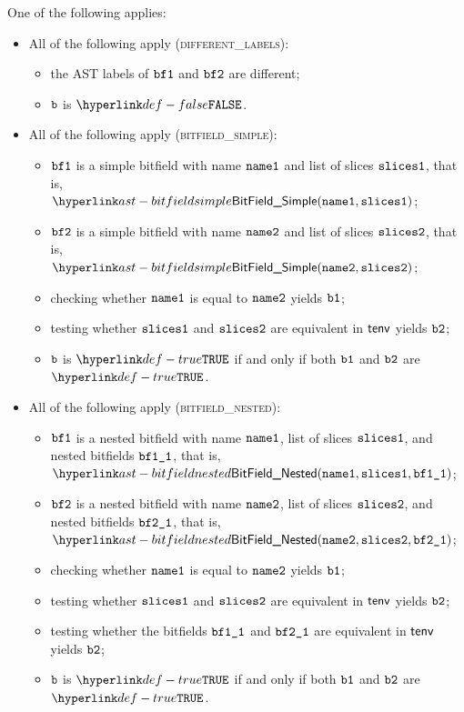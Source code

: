 One of the following applies:
\begin{itemize}
  \item All of the following apply (\textsc{different\_labels}):
  \begin{itemize}
    \item the AST labels of $\texttt{bf1}$ and $\texttt{bf2}$ are different;
    \item $\texttt{b}$ is $\False$.
  \end{itemize}

  \item All of the following apply (\textsc{bitfield\_simple}):
  \begin{itemize}
    \item $\texttt{bf1}$ is a simple bitfield with name $\texttt{name1}$ and list of slices $\texttt{slices1}$, that is, \\ $\BitFieldSimple(\nameone, \slicesone)$;
    \item $\texttt{bf2}$ is a simple bitfield with name $\texttt{name2}$ and list of slices $\texttt{slices2}$, that is, \\ $\BitFieldSimple(\nametwo, \slicestwo)$;
    \item checking whether $\texttt{name1}$ is equal to $\texttt{name2}$ yields $\texttt{b1}$;
    \item testing whether $\texttt{slices1}$ and $\texttt{slices2}$ are equivalent in $\textsf{tenv}$ yields $\texttt{b2}$\ProseOrTypeError;
    \item $\texttt{b}$ is $\True$ if and only if both $\texttt{b1}$ and $\texttt{b2}$ are $\True$.
  \end{itemize}

  \item All of the following apply (\textsc{bitfield\_nested}):
  \begin{itemize}
    \item $\texttt{bf1}$ is a nested bitfield with name $\texttt{name1}$, list of slices $\texttt{slices1}$, and nested bitfields $\texttt{bf1\_1}$, that is,
          $\BitFieldNested(\nameone, \slicesone, \bfoneone)$;
    \item $\texttt{bf2}$ is a nested bitfield with name $\texttt{name2}$, list of slices $\texttt{slices2}$, and nested bitfields $\texttt{bf2\_1}$, that is,
          $\BitFieldNested(\nametwo, \slicestwo, \bftwoone)$;
    \item checking whether $\texttt{name1}$ is equal to $\texttt{name2}$ yields $\texttt{b1}$;
    \item testing whether $\texttt{slices1}$ and $\texttt{slices2}$ are equivalent in $\textsf{tenv}$ yields $\texttt{b2}$\ProseOrTypeError;
    \item testing whether the bitfields $\texttt{bf1\_1}$ and $\texttt{bf2\_1}$ are equivalent in $\textsf{tenv}$ yields $\texttt{b2}$\ProseOrTypeError;
    \item $\texttt{b}$ is $\True$ if and only if both $\texttt{b1}$ and $\texttt{b2}$ are $\True$.
  \end{itemize}


\end{itemize}
